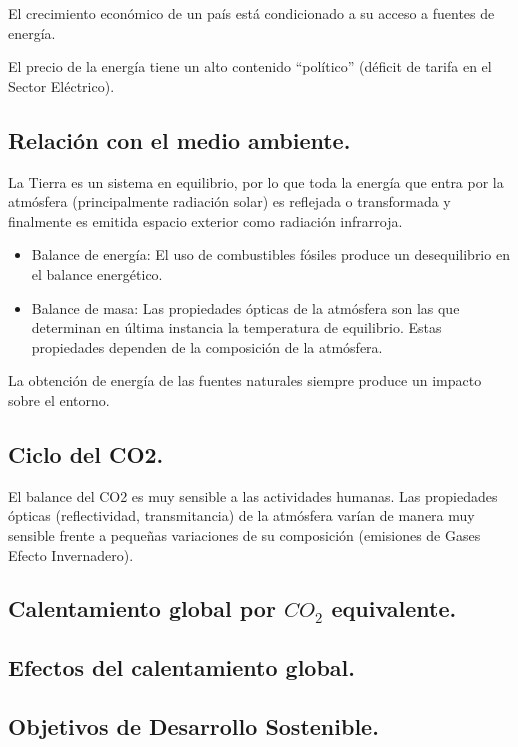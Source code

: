 El crecimiento económico de un país está condicionado a su acceso a fuentes de energía.

El precio de la energía tiene un alto contenido ``político'' (déficit de tarifa en el Sector Eléctrico).

\subsection{Relación con el medio ambiente.}
La Tierra es un sistema en equilibrio, por lo que toda la energía que entra por la atmósfera (principalmente radiación solar) es reflejada o transformada y finalmente es emitida espacio exterior como radiación infrarroja.

\begin{itemize}
    \item Balance de energía: El uso de combustibles fósiles produce un desequilibrio en el balance energético.
    \item Balance de masa: Las propiedades ópticas de la atmósfera son las que determinan en última instancia la temperatura de equilibrio. Estas propiedades dependen de la composición de la atmósfera.
\end{itemize}

La obtención de energía de las fuentes naturales siempre produce un impacto sobre el entorno.

\subsection{Ciclo del CO2.}
El balance del CO2 es muy sensible a las actividades humanas. Las propiedades ópticas (reflectividad, transmitancia) de la atmósfera varían de manera muy sensible frente a pequeñas variaciones de su composición (emisiones de Gases Efecto Invernadero).

\subsection{Calentamiento global por $CO_2$ equivalente.}

\subsection{Efectos del calentamiento global.}

\subsection{Objetivos de Desarrollo Sostenible.}
